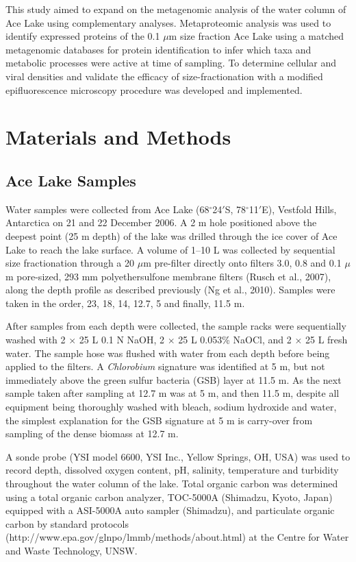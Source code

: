 This study aimed to expand on the metagenomic analysis of the water column of Ace Lake using complementary analyses.
Metaproteomic analysis was used to identify expressed proteins of the 0.1 $\mu$m size fraction Ace Lake using a matched metagenomic databases for protein identification to infer which taxa and metabolic processes were active at time of sampling.
To determine cellular and viral densities and validate the efficacy of size-fractionation with a modified epifluorescence microscopy procedure was developed and implemented.


\section{Materials and Methods}
\subsection{Ace Lake Samples}
Water samples were collected from Ace Lake (68$^{\circ}$24$'$S, 78$^{\circ}$11$'$E), Vestfold Hills, Antarctica on 21 and 22 December 2006. 
A 2 m hole positioned above the deepest point (25 m depth) of the lake was drilled through the ice cover of Ace Lake to reach the lake surface.
A volume of 1--10 L was collected by sequential size fractionation through a 20 $\mu$m pre-filter directly onto filters 3.0, 0.8 and 0.1 $\mu$m pore-sized, 293 mm polyethersulfone membrane filters (Rusch et al., 2007), along the depth profile as described previously (Ng et al., 2010).
Samples were taken in the order, 23, 18, 14, 12.7, 5 and finally, 11.5 m.

After samples from each depth were collected, the sample racks were sequentially washed with 2 $\times$ 25 L 0.1 N NaOH, 2 $\times$ 25 L 0.053\% NaOCl, and 2 $\times$ 25 L fresh water. 
The sample hose was flushed with water from each depth before being applied to the filters. 
A \textit{Chlorobium} signature was identified at 5 m, but not immediately above the green sulfur bacteria (GSB) layer at 11.5 m. 
As the next sample taken after sampling at 12.7 m was at 5 m, and then 11.5 m, despite all equipment being thoroughly washed with bleach, sodium hydroxide and water, 
the simplest explanation for the GSB signature at 5 m is carry-over from sampling of the dense biomass at 12.7 m. 

A sonde probe (YSI model 6600, YSI Inc., Yellow Springs, OH, USA) was used to record depth, dissolved oxygen content, pH, salinity, temperature and turbidity throughout the water column of the lake. 
Total organic carbon was determined using a total organic carbon analyzer, TOC-5000A (Shimadzu, Kyoto, Japan) equipped with a ASI-5000A auto sampler (Shimadzu), and particulate organic carbon by standard protocols \\
(http://www.epa.gov/glnpo/lmmb/methods/about.html) 
at the Centre for Water and Waste Technology, UNSW.


